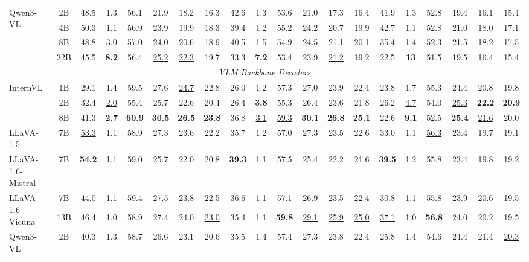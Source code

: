 \begin{table}[t]
{\begin{tabular}{lc|cccccc|cccccc|cccccc}
\multirow{4}{*}{Qwen3-VL} & 2B & 48.5 & 1.3 & 56.1 & 21.9 & 18.2 & 16.3 & 42.6 & 1.3 & 53.6 & 21.0 & 17.3 & 16.4 & 41.9 & 1.3 & 52.8 & 19.4 & 16.1 & 15.4 \\
 & 4B & 50.3 & 1.1 & 56.9 & 23.9 & 19.9 & 18.3 & 39.4 & 1.2 & 55.2 & 24.2 & 20.7 & 19.9 & 42.7 & 1.1 & 52.8 & 21.0 & 18.0 & 17.1 \\
 & 8B & 48.8 & \underline{3.0} & 57.0 & 24.0 & 20.6 & 18.9 & 40.5 & \underline{1.5} & 54.9 & \underline{24.5} & 21.1 & \underline{20.1} & 35.4 & 1.4 & 52.3 & 21.5 & 18.2 & 17.5 \\
 & 32B & 45.5 & \textbf{8.2} & 56.4 & \underline{25.2} & \underline{22.3} & 19.7 & 33.3 & \textbf{7.2} & 53.4 & 23.9 & \underline{21.2} & 19.2 & 22.5 & \textbf{13} & 51.5 & 19.5 & 16.4 & 15.4 \\
\midrule
\multicolumn{20}{c}{\textit{VLM Backbone Decoders}} \\
\midrule
\multirow{3}{*}{InternVL} & 1B & 29.1 & 1.4 & 59.5 & 27.6 & \underline{24.7} & 22.8 & 26.0 & 1.2 & 57.3 & 27.0 & 23.9 & 22.4 & 23.8 & 1.7 & 55.3 & 24.4 & 20.8 & 19.8 \\
 & 2B & 32.4 & \underline{2.0} & 55.4 & 25.7 & 22.6 & 20.4 & 26.4 & \textbf{3.8} & 55.3 & 26.4 & 23.6 & 21.8 & 26.2 & \underline{4.7} & 54.0 & \underline{25.3} & \textbf{22.2} & \textbf{20.9} \\
 & 8B & 41.3 & \textbf{2.7} & \textbf{60.9} & \textbf{30.5} & \textbf{26.5} & \textbf{23.8} & 36.8 & \underline{3.1} & \underline{59.3} & \textbf{30.1} & \textbf{26.8} & \textbf{25.1} & 22.6 & \textbf{9.1} & 52.5 & \textbf{25.4} & \underline{21.6} & 20.0 \\
LLaVA-1.5 & 7B & \underline{53.3} & 1.1 & 58.9 & 27.3 & 23.6 & 22.2 & 35.7 & 1.2 & 57.0 & 27.3 & 23.5 & 22.6 & 33.0 & 1.1 & \underline{56.3} & 23.4 & 19.7 & 19.1 \\
LLaVA-1.6-Mistral & 7B & \textbf{54.2} & 1.1 & 59.0 & 25.7 & 22.0 & 20.8 & \textbf{39.3} & 1.1 & 57.5 & 25.4 & 22.2 & 21.6 & \textbf{39.5} & 1.2 & 55.8 & 23.4 & 19.8 & 19.2 \\
\multirow{2}{*}{LLaVA-1.6-Vicuna} & 7B & 44.0 & 1.1 & 59.4 & 27.5 & 23.8 & 22.5 & 36.6 & 1.1 & 57.1 & 26.9 & 23.5 & 22.4 & 30.8 & 1.1 & 55.8 & 23.9 & 20.6 & 19.5 \\
 & 13B & 46.4 & 1.0 & 58.9 & 27.4 & 24.0 & \underline{23.0} & 35.4 & 1.1 & \textbf{59.8} & \underline{29.1} & \underline{25.9} & \underline{25.0} & \underline{37.1} & 1.0 & \textbf{56.8} & 24.0 & 20.2 & 19.5 \\
\multirow{4}{*}{Qwen3-VL} & 2B & 40.3 & 1.3 & 58.7 & 26.6 & 23.1 & 20.6 & 35.5 & 1.4 & 57.4 & 27.3 & 23.8 & 22.4 & 25.8 & 1.4 & 54.6 & 24.4 & 21.4 & \underline{20.3} \\

\end{tabular}}
\end{table}
